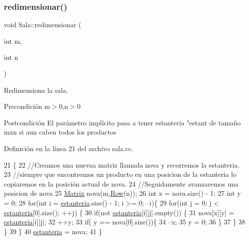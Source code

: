 \subsubsection{\texorpdfstring{redimensionar()}{redimensionar()}}
{\footnotesize\ttfamily void Sala\+::redimensionar (\begin{DoxyParamCaption}\item[{int}]{m,  }\item[{int}]{n }\end{DoxyParamCaption})}



Redimensiona la sala. 

\begin{DoxyPrecond}{Precondición}
m$>$0,n$>$0 
\end{DoxyPrecond}
\begin{DoxyPostcond}{Postcondición}
El parámetro implícito pasa a tener estanteria "estant de tamaño mxn si aun caben todos los productos 
\end{DoxyPostcond}


Definición en la línea 21 del archivo sala.\+cc.


\begin{DoxyCode}
21                                     \{
22     \textcolor{comment}{//Creamos una nuevaa matriz llamada nova y recorremos la estanteria.}
23     \textcolor{comment}{//siempre que encontremos un producto en una posicion de la estanteria lo copiaremos en la posición
       actual de nova.}
24     \textcolor{comment}{//Seguidamente avanzaremos una posicion de nova}
25     \mbox{\hyperlink{almacen_8hh_acdf2b2dca71b1d617c96d1afa6a525fa}{Matrix}} nova(m,\mbox{\hyperlink{sala_8hh_aa33775a3e721e5fbd17b48a94ed3ca94}{Row}}(n));
26     \textcolor{keywordtype}{int} x = nova.size() - 1;
27     \textcolor{keywordtype}{int} y = 0;
28     \textcolor{keywordflow}{for}(\textcolor{keywordtype}{int} i = \mbox{\hyperlink{class_sala_a8f5264818c98db9c0d075c51a7672d95}{estanteria}}.size() - 1; i >= 0; --i)\{
29         \textcolor{keywordflow}{for}(\textcolor{keywordtype}{int} j = 0; j < \mbox{\hyperlink{class_sala_a8f5264818c98db9c0d075c51a7672d95}{estanteria}}[0].size(); ++j) \{
30             \textcolor{keywordflow}{if}(not \mbox{\hyperlink{class_sala_a8f5264818c98db9c0d075c51a7672d95}{estanteria}}[i][j].empty()) \{
31                 nova[x][y] = \mbox{\hyperlink{class_sala_a8f5264818c98db9c0d075c51a7672d95}{estanteria}}[i][j];
32                 ++y;
33                 \textcolor{keywordflow}{if}( y == nova[0].size())\{
34                     --x;
35                     y = 0;
36                 \}
37             \}
38         \}
39     \}
40     \mbox{\hyperlink{class_sala_a8f5264818c98db9c0d075c51a7672d95}{estanteria}} = nova;
41 \}
\end{DoxyCode}
\mbox{\label{class_sala_aac11486a22560bdcdb7771e9692cfa75}} 
